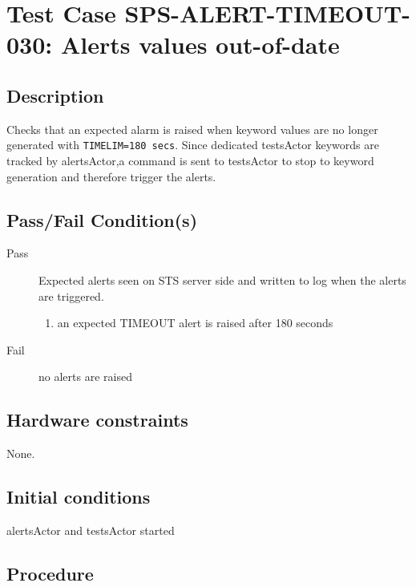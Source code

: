 \section{Test Case SPS-ALERT-TIMEOUT-030: Alerts values out-of-date}

\subsection{Description}

Checks that an expected alarm is raised when keyword values are no longer generated with \texttt{TIMELIM=180 secs}.
Since dedicated testsActor keywords are tracked by alertsActor,a command is sent to testsActor to stop to keyword generation and therefore trigger the alerts.

\subsection{Pass/Fail Condition(s)}

\begin{description}
\item [Pass] Expected alerts seen on STS server side and written to log when the alerts are triggered.

\begin{enumerate}
    \item  an expected TIMEOUT alert is raised after 180 seconds

\end{enumerate}
\item [Fail] no alerts are raised

\end{description}

\subsection{Hardware constraints}

None.

\subsection{Initial conditions}

alertsActor and testsActor started

\subsection{Procedure}
\label{sec:alerts-proc}


